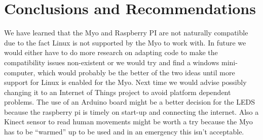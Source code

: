 \documentclass[12pt,a4paper,oneside,openany]{book}
\begin{document}
\chapter*{Conclusions and Recommendations}
We have learned that the Myo and Raspberry PI are not naturally compatible due to the fact Linux is not supported by the Myo to work with. In future we would either have to do more research on adapting code to make the compatibility issues non-existent or we would try and find a windows mini-computer, which would probably be the better of the two ideas until more support for Linux is enabled for the Myo. Next time we would advise possibly changing it to an Internet of Things project to avoid platform dependent problems. The use of an Arduino board might be a better decision for the LEDS because the raspberry pi is timely on start-up and connecting the internet. Also a Kinect sensor to read human movements might be worth a try because the Myo has to be “warmed” up to be used and in an emergency this isn’t acceptable.
\end{document}
